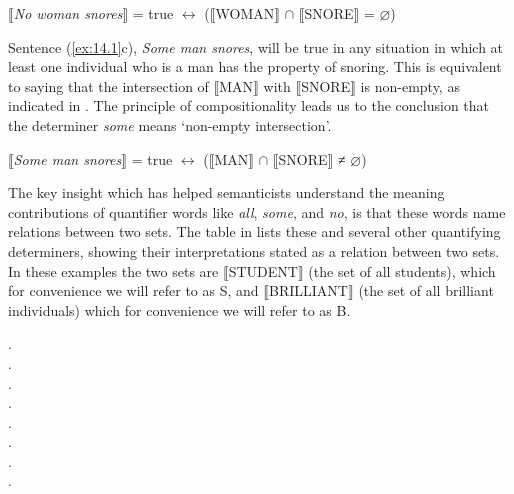 \ea \label{ex:14.3}
{}$\llbracket$\textit{No woman snores}$\rrbracket$  = true $\leftrightarrow $ ($\llbracket$WOMAN$\rrbracket$  ${\cap}$ $\llbracket$SNORE$\rrbracket$  = ⌀)
\z


Sentence (\ref{ex:14.1}c), \textit{Some man snores}, will be true in any situation in which at least one individual who is a man has the property of snoring. This is equivalent to saying that the intersection of $\llbracket$MAN$\rrbracket$  with $\llbracket$SNORE$\rrbracket$  is non-empty, as indicated in . The principle of compositionality leads us to the conclusion that the determiner \textit{some} means ‘non-empty intersection’.


\ea \label{ex:14.4}
{}$\llbracket$\textit{Some man snores}$\rrbracket$  = true $\leftrightarrow $ ($\llbracket$MAN$\rrbracket$  ${\cap}$ $\llbracket$SNORE$\rrbracket$  ≠ ⌀)
\z


The key insight which has helped semanticists understand the meaning contributions of quantifier words like \textit{all}, \textit{some}, and \textit{no}, is that these words name relations between two sets. The table in  lists these and several other quantifying determiners, showing their interpretations stated as a relation between two sets. In these examples the two sets are \textsc{$\llbracket$}STUDENT$\rrbracket$  (the set of all students), which for convenience we will refer to as S, and \textsc{$\llbracket$}BRILLIANT$\rrbracket$  (the set of all brilliant individuals) which for convenience we will refer to as B.

\ea \label{ex:14.5}
.\\ 
. \\ 
.\\ 
.\\ 
.\\ 
.\\ 
.\\ 
.\\ 
\z \z
{}

